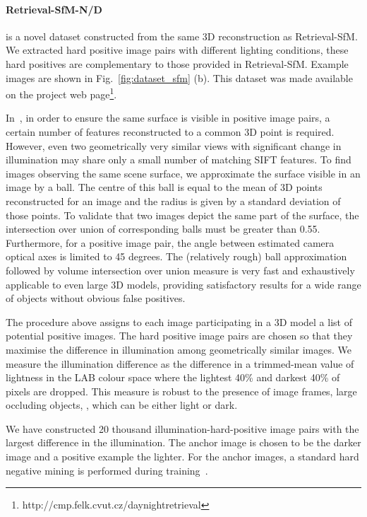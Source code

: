 \paragraph{Retrieval-SfM-N/D} is a novel dataset constructed from the same 3D reconstruction as Retrieval-SfM. We extracted hard positive image pairs with different lighting conditions, these hard positives are complementary to those provided in Retrieval-SfM. Example images are shown in Fig.~\ref{fig:dataset_sfm} (b). This dataset was made available on the project web page\footnote{http://cmp.felk.cvut.cz/daynightretrieval}.

In~\cite{Radenovic-TPAMI18}, in order to ensure the same surface is visible in positive image pairs, a certain number of features reconstructed to a common 3D point is required. However, even two geometrically very similar views with significant change in illumination may share only a small number of matching SIFT features. To find images observing the same scene surface, we approximate the surface visible in an image by a ball. The centre of this ball is equal to the mean of 3D points reconstructed for an image and the radius is given by a standard deviation of those points. To validate that two images depict the same part of the surface, the intersection over union of corresponding balls must be greater than 0.55. Furthermore, for a positive image pair, the angle between estimated camera optical axes is limited to 45 degrees.
The (relatively rough) ball approximation followed by volume intersection over union measure is very fast and exhaustively applicable to even large 3D models, providing satisfactory results for a wide range of objects without obvious false positives.

The procedure above assigns to each image participating in a 3D model a list of potential positive images.
The hard positive image pairs are chosen so that they maximise the difference in illumination among geometrically similar images. We measure the illumination difference as the difference in a trimmed-mean value of lightness in the LAB colour space where the lightest 40\% and darkest 40\% of pixels are dropped. This measure is robust to the presence of image frames, large occluding objects, \etc, which can be either light or dark.

We have constructed 20 thousand illumination-hard-positive image pairs with the largest difference in the illumination. The anchor image is chosen to be the darker image and a positive example the lighter. For the anchor images, a standard hard negative mining is performed during training~\cite{Radenovic-TPAMI18}. 

